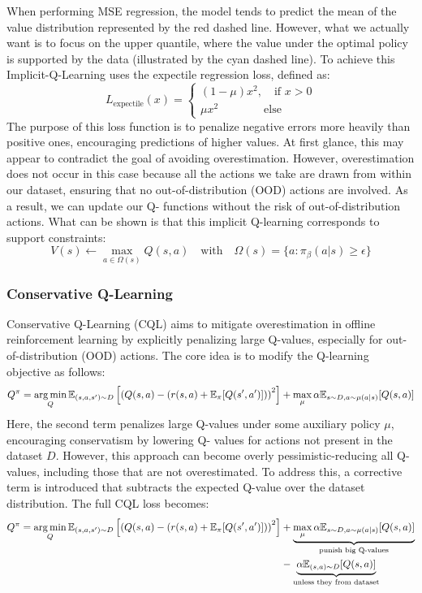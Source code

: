 When performing MSE regression, the model tends to predict the mean of the value distribution represented 
by the red dashed line. However, what we actually want is to focus on the upper quantile, where the value
under the optimal policy is supported by the data (illustrated by the cyan dashed line).  
To achieve this Implicit-Q-Learning \cite{kostrikov2021offlinereinforcementlearningimplicit} uses the expectile 
regression loss, defined as:
$$L_\text{expectile}(x) = 
\begin{cases}
(1-\mu)x^2,\quad \text{if } x> 0\\ \mu x^2\qquad\qquad \text{else} 
\end{cases}$$ 
The purpose of this loss function is to penalize negative errors more heavily than 
positive ones, encouraging predictions of higher values. At first glance, this may appear 
to contradict the goal of avoiding overestimation. However, overestimation does not occur 
in this case because all the actions we take are drawn from within our dataset, ensuring 
that no out-of-distribution (OOD) actions are involved. As a result, we can update our Q-
functions without the risk of out-of-distribution actions.\newline
What can be shown is that this implicit Q-learning corresponds to support constraints:
$$V(s) \gets \max_{a \in \Omega(s)} Q(s,a) \quad \text{with} \quad \Omega(s) = \{a:\pi_\beta(a|s)\geq \epsilon\}$$

\subsubsection{Conservative Q-Learning}
Conservative Q-Learning (CQL) \cite{kumar2020conservativeqlearningofflinereinforcement} aims to mitigate overestimation in 
offline reinforcement learning by explicitly penalizing large 
Q-values, especially for out-of-distribution (OOD) actions. The core idea is to modify the Q-learning objective as follows:
$$Q^\pi = \operatorname*{arg\,min}\limits_Q \mathbb{E}_{(s,a,s')\sim D}\left[\left(Q(s,a)-(r(s,a)+\mathbb{E}_\pi[Q(s',a')])\right)^2\right] + \max_\mu \alpha \mathbb{E}_{s\sim D, a\sim \mu(a|s)}[Q(s,a)] $$ 
Here, the second term penalizes large Q-values under some auxiliary policy $\mu$, encouraging conservatism by lowering Q-
values for actions not present in the dataset $D$.\newline
However, this approach can become overly pessimistic-reducing all Q-values, including those that are not overestimated. To 
address this, a corrective term is introduced that subtracts the expected Q-value over the dataset distribution. The full CQL 
loss becomes:
\begin{align*}
    Q^\pi =\operatorname*{arg\,min}\limits_Q \mathbb{E}_{(s,a,s')\sim D}\left[\left(Q(s,a)-(r(s,a)+\mathbb{E}_\pi[Q(s',a')])\right)^2\right] &+ \underbrace{\max_\mu \alpha \mathbb{E}_{s\sim D, a\sim \mu(a|s)}[Q(s,a)]}_{\text{punish big Q-values}} \\&- \underbrace{\alpha \mathbb{E}_{(s,a)\sim D}[Q(s,a)]}_{\text{unless they from dataset}}
\end{align*}


